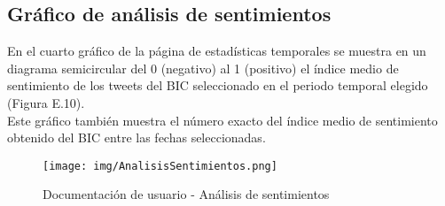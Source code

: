 \subsection{Gráfico de análisis de sentimientos}
En el cuarto gráfico de la página de estadísticas temporales se muestra en un diagrama semicircular del 0 (negativo) al 1 (positivo) el índice medio de sentimiento de los tweets del BIC seleccionado en el periodo temporal elegido (Figura E.10). \\
Este gráfico también muestra el número exacto del índice medio de sentimiento obtenido del BIC entre las fechas seleccionadas.\\
\begin{figure}[h!]
    \centering
    \texttt{[image: img/AnalisisSentimientos.png]} \\
    \caption{Documentación de usuario - Análisis de sentimientos}
    \label{Documentación de usuario - Análisis de sentimientos}
\end{figure}
